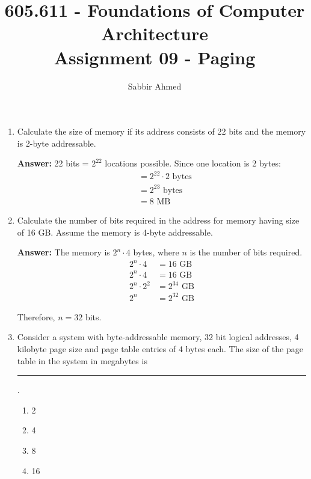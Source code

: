\documentclass[12pt]{article}
\newcommand{\answeritem}{\global\answertrue\item}
\newcommand{\perhapsanswer}{%
  \ifanswer
    $\blacksquare$ \global\answerfalse
  \else
    $\square$ \global\answerfalse
  \fi
}
\newif\ifanswer
\begin{document}
  \title{605.611 - Foundations of Computer Architecture \\ Assignment 09 - Paging\vspace{-0.5em}}
  \author{Sabbir Ahmed}
  \maketitle
  \vspace{-1em}

  \begin{enumerate}

  \item Calculate the size of memory if its address consists of 22 bits and the memory is 2-byte addressable.

  \textbf{Answer:}  
  22 bits = $2^{22}$ locations possible. Since one location is 2 bytes:
  \begin{align*}
    &= 2^{22} \cdot 2 \text{ bytes}\\
    &= 2^{23} \text{ bytes}\\
    &= 8 \text{ MB}
  \end{align*}

  \item Calculate the number of bits required in the address for memory having size of 16 GB. Assume the memory is 4-byte addressable.

  \textbf{Answer:} The memory is $2^n \cdot 4$ bytes, where $n$ is the number of bits required.
  \begin{align*}
    2^n \cdot 4 &= 16 \text{ GB}\\
    2^n \cdot 4 &= 16 \text{ GB}\\
    2^n \cdot 2^2 &= 2^{34} \text{ GB}\\
    2^n &= 2^{32} \text{ GB}
  \end{align*}

  Therefore, $n = 32$ bits.

  \item Consider a system with byte-addressable memory, 32 bit logical addresses, 4 kilobyte page size and page table entries of 4 bytes each. The size of the page table in the system in megabytes is \rule{1cm}{0.15mm}.

  \begin{enumerate}[start=1,align=left,label={\protect\perhapsanswer(\alph*)}]
    \item 2
    \answeritem 4
    \item 8
    \item 16
  \end{enumerate}


\end{enumerate}
\end{document}
